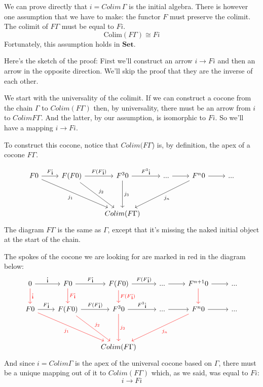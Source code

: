 \documentclass[DaoFP]{subfiles}
\begin{document}
We can  prove directly that $i = Colim\, \Gamma$ is the initial algebra. There is however one assumption that we have to make: the functor $F$ must preserve the colimit. The colimit of $F \Gamma$ must be equal to $F i$.
\[ \text{Colim} (F \Gamma) \cong F i \]
Fortunately, this assumption holds in $\mathbf{Set}$. 

Here's the sketch of the proof: First we'll construct an arrow $i \to F i$ and then an arrow in the opposite direction. We'll skip the proof that they are the inverse of each other.

We start with the universality of the colimit. If we can construct a cocone from the chain $\Gamma$ to $Colim (F \Gamma)$ then, by universality, there must be an arrow from $i$ to $Colim F \Gamma$. And the latter, by our assumption, is isomorphic to $F i$. So we'll have a mapping $i \to F i$.

To construct this cocone, notice that $Colim (F \Gamma$) is, by definition, the apex of a cocone $F \Gamma$. 

\[
 \begin{tikzcd}
 F 0
 \arrow[r, "F \mbox{!`}"]
 \arrow[ddrr, "j_1"']
 &  F (F 0)
  \arrow[r, "F(F  \mbox{!`})"]
 \arrow[ddr, "j_2"]
& F^3 0
  \arrow[r, "F^3\mbox{!`}"]
  \arrow[dd, "j_3"]
 & ...
 \arrow[r]
 & F^n 0
  \arrow[r]
 \arrow[ddll, "j_n"]
 & ...
 \\
 \\
 &&Colim (F \Gamma)
  \end{tikzcd}
\]
The diagram $F \Gamma$ is the same as $\Gamma$, except that it's missing the naked initial object at the start of the chain.

The spokes of the cocone we are looking for are marked in red in the diagram below:
\[
 \begin{tikzcd}
 0
 \arrow[r, "\mbox{!`}"]
 \arrow[d, red, "\mbox{!`}"]
 & F 0
  \arrow[r, "F\mbox{!`}"]
  \arrow[d, red, "F\mbox{!`}"]
& F (F 0)
  \arrow[r, "F(F\mbox{!`})"]
  \arrow[d, red, "F(F\mbox{!`})"]
 & ...
 \arrow[r]
 & F^{n+1} 0
  \arrow[r]
  \arrow[d, red]
 & ...
 \\
 F 0
 \arrow[r, "F \mbox{!`}"]
 \arrow[ddrr, red, "j_1"']
 &  F (F 0)
  \arrow[r, "F(F  \mbox{!`})"]
 \arrow[ddr, red, "j_2"]
& F^3 0
  \arrow[r, "F^3\mbox{!`}"]
  \arrow[dd, red, "j_3"]
 & ...
 \arrow[r]
 & F^n 0
  \arrow[r]
 \arrow[ddll, red, "j_n"]
 & ...
 \\
 \\
 &&Colim (F \Gamma)
  \end{tikzcd}
\]
And since $i = Colim \Gamma$ is the apex of the universal cocone based on $\Gamma$, there must be a unique mapping out of it to $Colim (F \Gamma)$ which, as we said, was equal to $F i$:
\[ i \to F i \]
\end{document}
